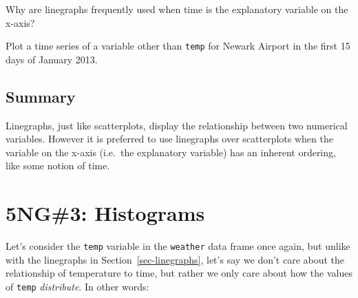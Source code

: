 \documentclass[
  letterpaper,
  DIV=11,
  numbers=noendperiod]{scrreprt}
\theoremstyle{definition}
\theoremstyle{remark}
\begin{document}
\begin{tcolorbox}[enhanced jigsaw, colback=white, toprule=.15mm, bottomrule=.15mm, titlerule=0mm, title={{🎯} Learning Check 2.12}, leftrule=.75mm, arc=.35mm, left=2mm, colframe=quarto-callout-tip-color-frame, coltitle=black, opacitybacktitle=0.6, bottomtitle=1mm, colbacktitle=quarto-callout-tip-color!10!white, opacityback=0, toptitle=1mm, rightrule=.15mm, breakable]

Why are linegraphs frequently used when time is the explanatory variable
on the x-axis?

\end{tcolorbox}

\begin{tcolorbox}[enhanced jigsaw, colback=white, toprule=.15mm, bottomrule=.15mm, titlerule=0mm, title={{🎯} Learning Check 2.13}, leftrule=.75mm, arc=.35mm, left=2mm, colframe=quarto-callout-tip-color-frame, coltitle=black, opacitybacktitle=0.6, bottomtitle=1mm, colbacktitle=quarto-callout-tip-color!10!white, opacityback=0, toptitle=1mm, rightrule=.15mm, breakable]

Plot a time series of a variable other than \texttt{temp} for Newark
Airport in the first 15 days of January 2013.

\end{tcolorbox}

\hypertarget{summary-1}{%
\subsection{Summary}\label{summary-1}}

Linegraphs, just like scatterplots, display the relationship between two
numerical variables. However it is preferred to use linegraphs over
scatterplots when the variable on the x-axis (i.e.~the explanatory
variable) has an inherent ordering, like some notion of time.

\hypertarget{sec-histograms}{%
\section{5NG\#3: Histograms}\label{sec-histograms}}

Let's consider the \texttt{temp} variable in the \texttt{weather} data
frame once again, but unlike with the linegraphs in
Section~\ref{sec-linegraphs}, let's say we don't care about the
relationship of temperature to time, but rather we only care about how
the values of \texttt{temp} \emph{distribute}. In other words:
\end{document}
